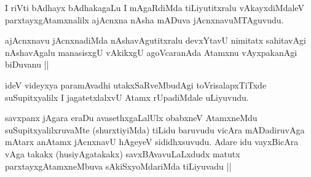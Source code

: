 
\begin{artha}
I riVti bAdhayx bAdhakagaLu I mAgaRdiMda tiLiyutitxralu vAkayxdiMdaleV parxtayxgAtamxnalilx ajAcnxna nAsha mADuva jAcnxnavuMTAguvudu.
\end{artha}

\begin{artha}
ajAcnxnavu jAcnxnadiMda nAshavAgutitxralu devxYtavU nimitatx sahitavAgi nAshavAgalu manasisxgU vAkikxgU agoVcaranAda Atamxnu vAyxpakanAgi biDuvanu ||
\end{artha}

\begin{artha}
ideV videyxya paramAvadhi utakxSaRveMbudAgi toVrisalapxTiTxde suSupitxyalilx I jagatetxlalxvU Atamx rUpadiMdale uLiyuvudu.
\end{artha}


\begin{artha}
savxpanx jAgara eraDu avasethxgaLalUlx obabxneV AtamxneMdu suSupitxyalilxruvaMte (shurxtiyiMda) tiLidu baruvudu vicAra mADadiruvAga mAtarx anAtamx jAcnxnavU hAgeyeV sididhxsuvudu. Adare idu vayxBicAra vAga takakx (husiyAgatakakx) savxBAvavuLaLxdudx matutx parxtayxgAtamxneMbuva sAkiSxyoMdariMda tiLiyuvadu ||
\end{artha}

